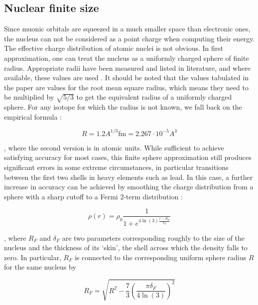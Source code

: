\documentclass[]{report}
\begin{document}
\subsection{Nuclear finite size}

Since muonic orbitals are squeezed in a much smaller space than electronic ones, the nucleus can not be considered as a point charge when computing their energy. The effective charge distribution of atomic nuclei is not obvious. In first approximation, one can treat the nucleus as a uniformly charged sphere of finite radius. Appropriate radii have been measured and listed in literature, and where available, these values are used \cite{angeli2013}. It should be noted that the values tabulated in the paper are values for the root mean square radius, which means they need to be multiplied by $\sqrt{5/3}$ to get the equivalent radius of a uniformly charged sphere. For any isotope for which the radius is not known, we fall back on the empirical formula \cite{borie1982}:

\begin{equation}\label{nuc_radius}
R = 1.2 A^{1/3} \mathrm{fm} = 2.267\cdot10^{-5}A^3
\end{equation}

, where the second version is in atomic units.\newline
While sufficient to achieve satisfying accuracy for most cases, this finite sphere approximation still produces significant errors in some extreme circumstances, in particular transitions between the first two shells in heavy elements such as lead. In this case, a further increase in accuracy can be achieved by smoothing the charge distribution from a sphere with a sharp cutoff to a Fermi 2-term distribution \cite{visscher1997}:

\begin{equation}\label{s:theory:fermi2}
\rho(r) = \rho_0\frac{1}{1+e^{4\ln (3) \frac{r-R_F}{\delta_F}}}
\end{equation}

, where $R_F$ and $\delta_F$ are two parameters corresponding roughly to the size of the nucleus and the thickness of its `skin', the shell across which the density falls to zero. In particular, $R_F$ is connected to the corresponding uniform sphere radius $R$  for the same nucleus by

\begin{equation}\label{s:theory:fermi2radius_heavy}
R_F = \sqrt{R^2-\frac{7}{3}\left(\frac{\pi \delta_F}{4\ln(3)}\right)^2}
\end{equation}
\end{document}
